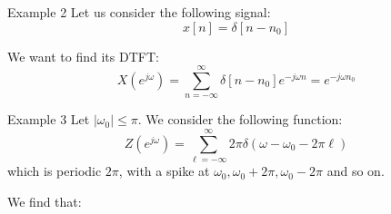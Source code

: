 \documentclass[a4paper]{article}
\begin{document}
\begin{parag}{Example 2}
    Let us consider the following signal: 
    \[x\left[n\right] = \delta \left[n - n_0\right]\]
    
    We want to find its DTFT: 
    \[X\left(e^{j \omega}\right) = \sum_{n=-\infty}^{\infty} \delta \left[n - n_0\right] e^{-j \omega n} = e^{-j \omega n_0}\]
\end{parag}

\begin{parag}{Example 3}
    Let $\left|\omega_0\right| \leq \pi$. We consider the following function: 
    \[Z\left(e^{j \omega}\right) = \sum_{\ell = -\infty}^{\infty} 2\pi \delta\left(\omega - \omega_0 - 2 \pi \ell \right)\]
    which is periodic $2\pi$, with a spike at $\omega_0, \omega_0 + 2\pi, \omega_0 - 2\pi$ and so on.
    
    We find that: 
\end{parag}
\end{document}
